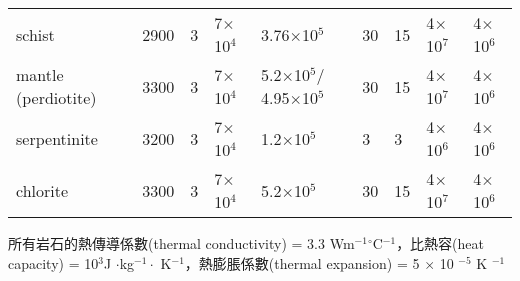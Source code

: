 \begin{landscape}
\begin{table}[htp]
\begin{tabular}{m{5.5cm}m{2cm}m{2cm}m{2.4cm}m{2.3cm}m{1cm}m{1cm}m{1.7cm}m{1.7cm}}
        schist                                                                                      & 2900                                                            & 3    & 7$\times$10$^4$                                                              & 3.76$\times$10$^5$                                                                         & 30                                                              & 15                                                              & 4$\times$10$^7$                                                & 4$\times$10$^6$                                                 \\
        mantle (perdiotite)                                                                         & 3300                                                            & 3    & 7$\times$10$^4$                                                              & 5.2$\times$10$^5$/ 4.95$\times$10$^5$                                                                      & 30                                                              & 15                                                              & 4$\times$10$^7$                                                & 4$\times$10$^6$                                                 \\
        serpentinite                                                                                & 3200                                                            & 3    & 7$\times$10$^4$                                                              & 1.2$\times$10$^5$                                                                          & 3                                                               & 3                                                               & 4$\times$10$^6$                                                & 4$\times$10$^6$                                                 \\
        chlorite                                                                                    & 3300                                                            & 3    & 7$\times$10$^4$                                                              & 5.2$\times$10$^5$                                                                          & 30                                                              & 15                                                              & 4$\times$10$^7$                                                & 4$\times$10$^6$                                                 \\ \hline
    \end{tabular}
\label{table::phase_table}
\footnotesize 所有岩石的熱傳導係數(thermal conductivity) = 3.3 Wm$^{-1}$$^{\circ}$C$^{-1}$，比熱容(heat capacity) = 10$^3$J $\cdot$kg$^{-1} \cdot$ K$^{-1}$，熱膨脹係數(thermal expansion) = 5 $\times$ 10 $^{-5}$ K $^{-1}$
\end{table}
\end{landscape}